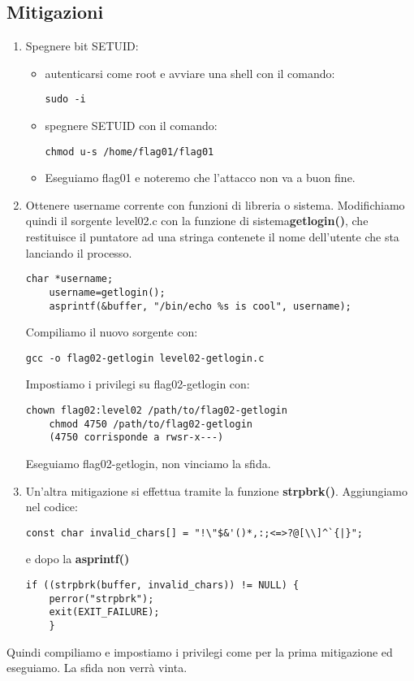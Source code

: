 \subsection{Mitigazioni}
\begin{enumerate}
    \item Spegnere bit SETUID:
    \begin{itemize}
        \item autenticarsi come root e avviare una shell con il comando: \begin{lstlisting}[style=bashstyle] 
        sudo -i
        \end{lstlisting}
        \item spegnere SETUID con il comando: \begin{lstlisting}[style=bashstyle] 
        chmod u-s /home/flag01/flag01
        \end{lstlisting}   
        \item Eseguiamo flag01 e noteremo che l’attacco non va a buon fine. 
    \end{itemize}
    \item Ottenere username corrente con funzioni di libreria o sistema. Modifichiamo quindi il sorgente level02.c con la funzione di sistema\textbf{getlogin()}, che restituisce il puntatore ad una stringa contenete il nome dell’utente che sta lanciando il processo.
    \begin{lstlisting}[style=cstyle]
    char *username; 
    username=getlogin(); 
    asprintf(&buffer, "/bin/echo %s is cool", username);
    \end{lstlisting}
    Compiliamo il nuovo sorgente con:
    \begin{lstlisting}[style=bashstyle]
    gcc -o flag02-getlogin level02-getlogin.c
    \end{lstlisting}
    Impostiamo i privilegi su flag02-getlogin con:
    \begin{lstlisting}[style=bashstyle]
    chown flag02:level02 /path/to/flag02-getlogin 
    chmod 4750 /path/to/flag02-getlogin
    (4750 corrisponde a rwsr-x---)
    \end{lstlisting}
    Eseguiamo flag02-getlogin, non vinciamo la sfida.
    \item Un’altra mitigazione si effettua tramite la funzione \textbf{strpbrk()}. Aggiungiamo nel codice:
    \begin{lstlisting}[style=cstyle]
    const char invalid_chars[] = "!\"$&'()*,:;<=>?@[\\]^`{|}";
    \end{lstlisting}
    e dopo la \textbf{asprintf()}
    \begin{lstlisting}[style=cstyle]
    if ((strpbrk(buffer, invalid_chars)) != NULL) { 
    perror("strpbrk"); 
    exit(EXIT_FAILURE); 
    }
    \end{lstlisting}
\end{enumerate}
Quindi compiliamo e impostiamo i privilegi come per la prima mitigazione ed eseguiamo. La sfida non verrà vinta.